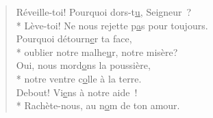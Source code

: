 \begin{verse}
Réveille-toi! Pourquoi dors-t\underline{u}, Seigneur ? \\*
Lève-toi! Ne nous rejette p\underline{a}s pour toujours. \\
Pourquoi détourn\underline{e}r ta face, \\*
oublier notre malhe\underline{u}r, notre misère? \\

Oui, nous mord\underline{o}ns la poussière, \\*
notre ventre c\underline{o}lle à la terre. \\
Debout! Vi\underline{e}ns à notre aide ! \\*
Rachète-nous, au n\underline{o}m de ton amour. \\
\end{verse}

